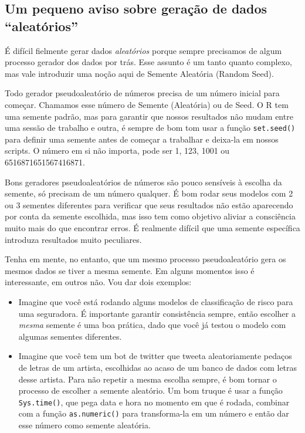 \documentclass[
]{article}
\begin{document}
\hypertarget{um-pequeno-aviso-sobre-gerauxe7uxe3o-de-dados-aleatuxf3rios}{%
\subsection{Um pequeno aviso sobre geração de dados
``aleatórios''}\label{um-pequeno-aviso-sobre-gerauxe7uxe3o-de-dados-aleatuxf3rios}}

É difícil fielmente gerar dados \emph{aleatórios} porque sempre
precisamos de algum processo gerador dos dados por trás. Esse assunto é
um tanto quanto complexo, mas vale introduzir uma noção aqui de Semente
Aleatória (Random Seed).

Todo gerador pseudoaleatório de números precisa de um número inicial
para começar. Chamamos esse número de Semente (Aleatória) ou de Seed. O
R tem uma semente padrão, mas para garantir que nossos resultados não
mudam entre uma sessão de trabalho e outra, é sempre de bom tom usar a
função \texttt{set.seed()} para definir uma semente antes de começar a
trabalhar e deixa-la em nossos scripts. O número em si não importa, pode
ser 1, 123, 1001 ou 6516871651567416871.

Bons geradores pseudoaleatórios de números são pouco sensíveis à escolha
da semente, só precisam de um número qualquer. É bom rodar seus modelos
com 2 ou 3 sementes diferentes para verificar que seus resultados não
estão aparecendo por conta da semente escolhida, mas isso tem como
objetivo aliviar a consciência muito mais do que encontrar erros. É
realmente difícil que uma semente específica introduza resultados muito
peculiares.

Tenha em mente, no entanto, que um mesmo processo pseudoaleatório gera
os mesmos dados se tiver a mesma semente. Em alguns momentos isso é
interessante, em outros não. Vou dar dois exemplos:

\begin{itemize}
\item
  Imagine que você está rodando alguns modelos de classificação de risco
  para uma seguradora. É importante garantir consistência sempre, então
  escolher a \emph{mesma} semente é uma boa prática, dado que você já
  testou o modelo com algumas sementes diferentes.
\item
  Imagine que você tem um bot de twitter que tweeta aleatoriamente
  pedaços de letras de um artista, escolhidas ao acaso de um banco de
  dados com letras desse artista. Para não repetir a mesma escolha
  sempre, é bom tornar o processo de escolher a semente aleatório. Um
  bom truque é usar a função \texttt{Sys.time()}, que pega data e hora
  no momento em que é rodada, combinar com a função
  \texttt{as.numeric()} para transforma-la em um número e então dar esse
  número como semente aleatória.
\end{itemize}
\end{document}
